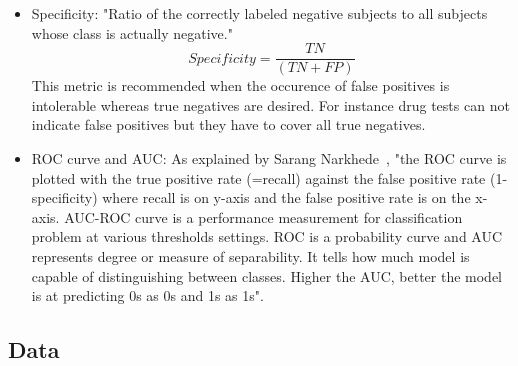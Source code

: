 \begin{itemize}
\item Specificity: "Ratio of the correctly labeled negative subjects to all subjects whose class is actually negative."
\begin{equation}
Specificity = \frac{TN}{(TN + FP)}
\end{equation}
This metric is recommended when the occurence of false positives is intolerable whereas true negatives are desired. For instance drug tests can not indicate false positives but they have to cover all true negatives.

\item ROC curve and AUC:
As explained by Sarang Narkhede~\cite{26}, "the ROC curve is plotted with the true positive rate (=recall) against the false positive rate (1-specificity) where recall is on y-axis and the false positive rate is on the x-axis. AUC-ROC curve is a performance measurement for classification problem at various thresholds settings. ROC is a probability curve and AUC represents degree or measure of separability. It tells how much model is capable of distinguishing between classes. Higher the AUC, better the model is at predicting 0s as 0s and 1s as 1s".

\end{itemize}




\subsection{Data}

